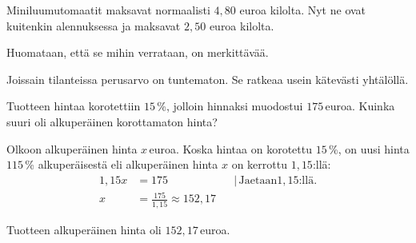 \begin{esimerkki}
Miniluumutomaatit maksavat normaalisti $4,80$ euroa kilolta. Nyt ne ovat kuitenkin alennuksessa ja maksavat $2,50$ euroa kilolta.
	\begin{esimratk}
     
\end{esimratk}
		
     \begin{esimvast}
     
Huomataan, että se mihin verrataan, on merkittävää.
      \end{esimvast}
     \end{esimerkki}

Joissain tilanteissa perusarvo on tuntematon. Se ratkeaa usein kätevästi yhtälöllä.
\begin{esimerkki}
Tuotteen hintaa korotettiin $15$\,\%, jolloin hinnaksi muodostui $175$\,euroa. Kuinka suuri oli alkuperäinen korottamaton hinta?
	\begin{esimratk}
Olkoon alkuperäinen hinta $x$\,euroa. Koska hintaa on korotettu $15$\,\%, on uusi hinta $115$\,\% alkuperäisestä eli alkuperäinen hinta $x$ on kerrottu $1,15$:llä:
\begin{align*}
	1,15x	&= 175	&	&|\, \text{Jaetaan} 1,15\text{:llä}.\\
	x	&= \frac{175}{1,15} \approx 152,17
\end{align*}
	\end{esimratk}
    \begin{esimvast}
    Tuotteen alkuperäinen hinta oli $152,17$\,euroa.
    \end{esimvast}
\end{esimerkki}

